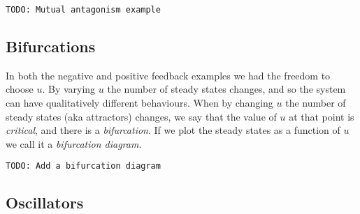 \documentclass[a4paper]{article}
\newcommand{\todo}[1]{\texttt{TODO: #1}}
\theoremstyle{plain}
\theoremstyle{definition}
\theoremstyle{remark}
\begin{document}
\todo{Mutual antagonism example}

\subsection{Bifurcations}

In both the negative and positive feedback examples we had the freedom to
choose $u$. By varying $u$ the number of steady states changes, and so the
system can have qualitatively different behaviours. When by changing $u$ the
number of steady states (aka attractors) changes, we say that the value of $u$
at that point is \emph{critical}, and there is a \emph{bifurcation}. If we
plot the steady states as a function of $u$ we call it a \emph{bifurcation
diagram}.

\todo{Add a bifurcation diagram}

\subsection{Oscillators}
\end{document}
